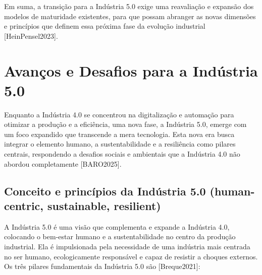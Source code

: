 Em suma, a transição para a Indústria 5.0 exige uma reavaliação e expansão dos modelos de maturidade existentes, para que possam abranger as novas dimensões e princípios que definem essa próxima fase da evolução industrial [HeinPensel2023].





\section{Avanços e Desafios para a Indústria 5.0}

Enquanto a Indústria 4.0 se concentrou na digitalização e automação para otimizar a produção e a eficiência, uma nova fase, a Indústria 5.0, emerge com um foco expandido que transcende a mera tecnologia. Esta nova era busca integrar o elemento humano, a sustentabilidade e a resiliência como pilares centrais, respondendo a desafios sociais e ambientais que a Indústria 4.0 não abordou completamente [BARO2025].

\subsection{Conceito e princípios da Indústria 5.0 (human-centric, sustainable, resilient)}

A Indústria 5.0 é uma visão que complementa e expande a Indústria 4.0, colocando o bem-estar humano e a sustentabilidade no centro da produção industrial. Ela é impulsionada pela necessidade de uma indústria mais centrada no ser humano, ecologicamente responsável e capaz de resistir a choques externos. Os três pilares fundamentais da Indústria 5.0 são [Breque2021]:

